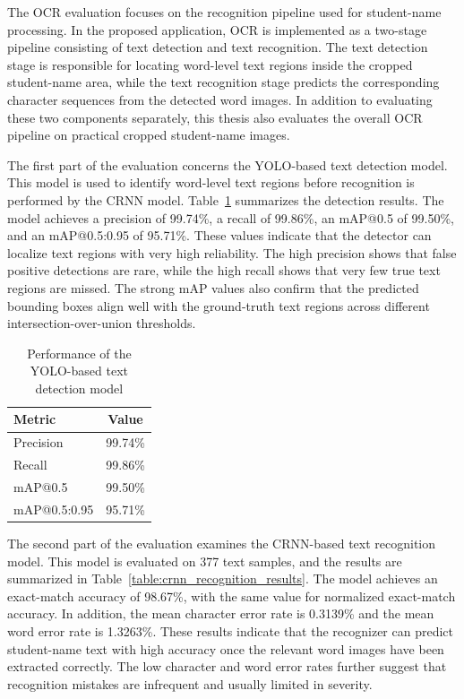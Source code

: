 \documentclass[../Main.tex]{subfiles}
\begin{document}
The OCR evaluation focuses on the recognition pipeline used for student-name
processing. In the proposed application, OCR is implemented as a two-stage
pipeline consisting of text detection and text recognition. The text detection
stage is responsible for locating word-level text regions inside the cropped
student-name area, while the text recognition stage predicts the corresponding
character sequences from the detected word images. In addition to evaluating
these two components separately, this thesis also evaluates the overall OCR
pipeline on practical cropped student-name images.

The first part of the evaluation concerns the YOLO-based text detection model.
This model is used to identify word-level text regions before recognition is
performed by the CRNN model. Table~\ref{table:yolo_detection_results}
summarizes the detection results. The model achieves a precision of 99.74\%, a
recall of 99.86\%, an mAP@0.5 of 99.50\%, and an mAP@0.5:0.95 of 95.71\%.
These values indicate that the detector can localize text regions with very high
reliability. The high precision shows that false positive detections are rare,
while the high recall shows that very few true text regions are missed. The
strong mAP values also confirm that the predicted bounding boxes align well
with the ground-truth text regions across different intersection-over-union
thresholds.

\begin{table}[H]
\centering
\caption{Performance of the YOLO-based text detection model}
\label{table:yolo_detection_results}
\begin{tabular}{lc}
\hline
\textbf{Metric} & \textbf{Value} \\ \hline
Precision & 99.74\% \\
Recall & 99.86\% \\
mAP@0.5 & 99.50\% \\
mAP@0.5:0.95 & 95.71\% \\ \hline
\end{tabular}
\end{table}

The second part of the evaluation examines the CRNN-based text recognition
model. This model is evaluated on 377 text samples, and the results are
summarized in Table~\ref{table:crnn_recognition_results}. The model achieves an
exact-match accuracy of 98.67\%, with the same value for normalized exact-match
accuracy. In addition, the mean character error rate is 0.3139\% and the mean
word error rate is 1.3263\%. These results indicate that the recognizer can
predict student-name text with high accuracy once the relevant word images have
been extracted correctly. The low character and word error rates further suggest
that recognition mistakes are infrequent and usually limited in severity.
\end{document}
